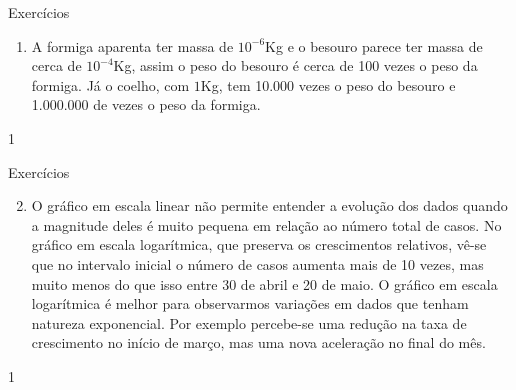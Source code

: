 \cleardoublepage

\exercise

\begin{answer}{Exercícios}
{\exerciselist

\begin{enumerate}

\item A formiga aparenta ter massa de $10^{-6}$Kg e o besouro parece ter massa de cerca de $10^{-4}$Kg, assim o peso do besouro é cerca de 100 vezes o peso da formiga. Já o coelho, com $1$Kg, tem 10.000 vezes o peso do besouro e 1.000.000 de vezes o peso da formiga.
\end{enumerate}
}{1}
\end{answer}

\clearmargin

\begin{answer}{Exercícios}
{
\exerciselist
\begin{enumerate}
\setcounter{enumi}{1}
\item O gráfico em escala linear não permite entender a evolução dos dados quando a magnitude deles é muito pequena em relação ao número total de casos. No gráfico em escala logarítmica, que preserva os crescimentos relativos, vê-se que no intervalo inicial o número de casos aumenta mais de 10 vezes, mas muito menos do que isso entre 30 de abril e 20 de maio. O gráfico em escala logarítmica é melhor para observarmos variações em dados que tenham natureza exponencial. Por exemplo percebe-se uma redução na taxa de crescimento no início de março, mas uma nova aceleração no final do mês.
\end{enumerate}
}{1}
\end{answer}

\clearmargin

